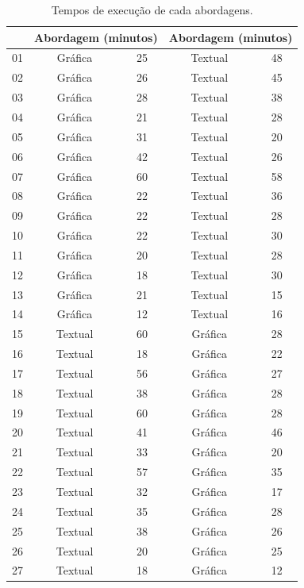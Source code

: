 \begin{table}[!htb]
    \caption{Tempos de execução de cada abordagens.}
    \label{tab:TemposGeral}
    \centering
    \tiny
    \begin{tabular}{c|cc|cc}
    \bottomrule
    \rowcolor[HTML]{C0C0C0}
    \multicolumn{1}{r}{Sujeito} &
    \multicolumn{2}{c}{\textbf{Abordagem (minutos)}} &
    \multicolumn{2}{c}{\textbf{Abordagem (minutos)}}
    \\ 
    \hline
    01	&	Gráfica	&	25	&	Textual	&	48	\\
    02	&	Gráfica	&	26	&	Textual	&	45	\\
    03	&	Gráfica	&	28	&	Textual	&	38	\\
    04	&	Gráfica	&	21	&	Textual	&	28	\\
    05	&	Gráfica	&	31	&	Textual	&	20	\\
    06	&	Gráfica	&	42	&	Textual	&	26	\\
    07	&	Gráfica	&	60	&	Textual	&	58	\\
    08	&	Gráfica	&	22	&	Textual	&	36	\\
    09	&	Gráfica	&	22	&	Textual	&	28	\\
    10	&	Gráfica	&	22	&	Textual	&	30	\\
    11	&	Gráfica	&	20	&	Textual	&	28	\\
    12	&	Gráfica	&	18	&	Textual	&	30	\\
    13	&	Gráfica	&	21	&	Textual	&	15	\\
    14	&	Gráfica	&	12	&	Textual	&	16	\\
    15	&	Textual	&	60	&	Gráfica	&	28	\\
    16	&	Textual	&	18	&	Gráfica	&	22	\\
    17	&	Textual	&	56	&	Gráfica	&	27	\\
    18	&	Textual	&	38	&	Gráfica	&	28	\\
    19	&	Textual	&	60	&	Gráfica	&	28	\\
    20	&	Textual	&	41	&	Gráfica	&	46	\\
    21	&	Textual	&	33	&	Gráfica	&	20	\\
    22	&	Textual	&	57	&	Gráfica	&	35	\\
    23	&	Textual	&	32	&	Gráfica	&	17	\\
    24	&	Textual	&	35	&	Gráfica	&	28	\\
    25	&	Textual	&	38	&	Gráfica	&	26	\\
    26	&	Textual	&	20	&	Gráfica	&	25	\\
    27	&	Textual	&	18	&	Gráfica	&	12	\\
    \toprule
    \end{tabular}
\end{table}

